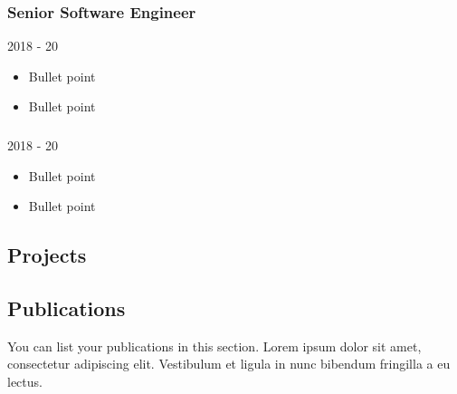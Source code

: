 \documentclass[english,]{article}
\providecommand{\tightlist}{%
  \setlength{\itemsep}{0pt}\setlength{\parskip}{0pt}}
\begin{document}
\hypertarget{senior-software-engineer}{%
\subsubsection{Senior Software
Engineer}\label{senior-software-engineer}}

2018 - 20

\begin{itemize}
\tightlist
\item
  Bullet point
\item
  Bullet point
\end{itemize}

\hypertarget{section-3}{%
\subsubsection{}\label{section-3}}

2018 - 20

\begin{itemize}
\tightlist
\item
  Bullet point
\item
  Bullet point
\end{itemize}

\hypertarget{projects}{%
\subsection{\texorpdfstring{{ \emph{} \emph{} }
Projects}{    Projects}}\label{projects}}

{ }

{ }

{ }

{ }

{ }

\hypertarget{publications}{%
\subsection{\texorpdfstring{{ \emph{} \emph{} }
Publications}{    Publications}}\label{publications}}

You can list your publications in this section. Lorem ipsum dolor sit
amet, consectetur adipiscing elit. Vestibulum et ligula in nunc bibendum
fringilla a eu lectus.

\hypertarget{section-4}{%
\subsection{\texorpdfstring{{ \emph{} \emph{} }}{   }}\label{section-4}}
\end{document}
